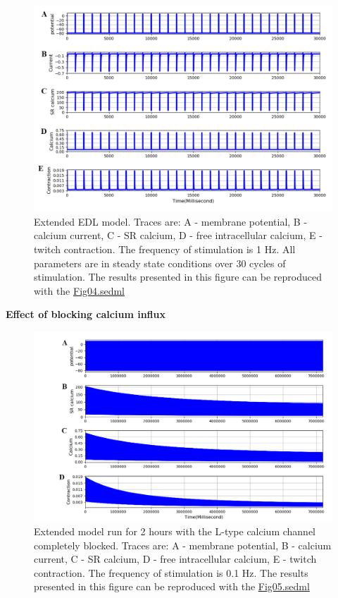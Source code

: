 \documentclass[fleqn,10pt]{physiome}
\begin{document}
\begin{figure}[ht]
\centering
\includegraphics[width=1\linewidth]{fig04}
\caption{Extended EDL model. Traces are: A - membrane potential, B - calcium current, C - SR calcium, D - free intracellular calcium, E - twitch contraction. The frequency of stimulation is 1 Hz. All parameters are in steady state conditions over 30 cycles of stimulation. The results presented in this figure can be reproduced with the \href{https://models.physiomeproject.org/workspace/5c6/rawfile/afd4d5cb20ecdcbc0b10198fe31795520488a34e/Fig04.sedml}{Fig04.sedml}} 
\label{fig04}
\end{figure}

\textbf{Effect of blocking calcium influx}

\begin{figure}[ht]
\centering
\includegraphics[width=0.9\linewidth]{fig05}
\caption{Extended model run for 2 hours with the L-type calcium channel completely blocked. Traces are: A - membrane potential, B - calcium current, C - SR calcium, D - free intracellular calcium, E - twitch contraction. The frequency of stimulation is 0.1 Hz. The results presented in this figure can be reproduced with the \href{https://models.physiomeproject.org/workspace/5c6/file/afd4d5cb20ecdcbc0b10198fe31795520488a34e/Fig05.sedml}{Fig05.sedml}} 
\label{fig05}
\end{figure}
\end{document}
